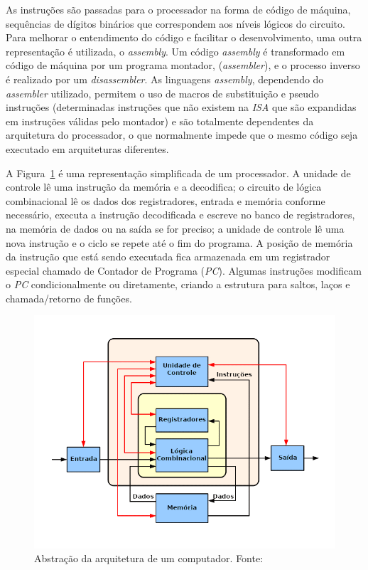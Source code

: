 { As instruções são passadas para o processador na forma de código de máquina,
    sequências de dígitos binários que correspondem aos níveis lógicos do
    circuito. Para melhorar o entendimento do código e facilitar o
    desenvolvimento, uma outra representação é utilizada, o \textit{assembly}.
    Um código \textit{assembly} é transformado em código de máquina por um
    programa montador, (\textit{assembler}), e o processo inverso é realizado
    por um \textit{disassembler}. As linguagens \textit{assembly}, dependendo do
    \textit{assembler} utilizado, permitem o uso de macros de substituição e
    pseudo instruções (determinadas instruções que não existem na \textit{ISA}
    que são expandidas em instruções válidas pelo montador) e são totalmente
    dependentes da arquitetura do processador, o que normalmente impede que o
    mesmo código seja executado em arquiteturas diferentes.
}

{ A Figura~\ref{fig:cpu_abstraction} é uma representação simplificada de um
    processador. A unidade de controle lê uma instrução da memória e a
    decodifica; o circuito de lógica combinacional lê os dados dos
    registradores, entrada e memória conforme necessário, executa a instrução
    decodificada e escreve no banco de registradores, na memória de dados ou
    na saída se for preciso; a unidade de controle lê uma nova instrução e o
    ciclo se repete até o fim do programa. A posição de memória da instrução
    que está sendo executada fica armazenada em um registrador especial chamado
    de Contador de Programa (\textit{PC}). Algumas instruções modificam o
    \textit{PC} condicionalmente ou diretamente, criando a estrutura para
    saltos, laços e chamada/retorno de funções.
}

\begin{figure}[H]
\centering
\includegraphics[width=.7\linewidth]
    {../images/ABasicComputer.png}
    \caption[Abstração da arquitetura de um computador]
    {Abstração da arquitetura de um
        computador. Fonte:~\cite{wikimedia2015basiccpu}}\label{fig:cpu_abstraction}
\end{figure}

